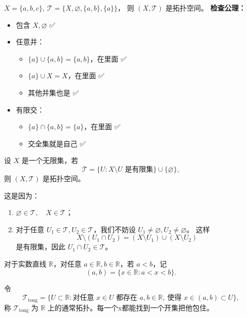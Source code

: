 \begin{example}
$X=\{a,b,c\},\ \mathcal{T}=\{X,\varnothing,\{a,b\},\{a\}\}$，  
则 $(X,\mathcal{T})$ 是拓扑空间。
\textbf{检查公理：}
\begin{itemize}
  \item 包含 $X, \varnothing$ ✅
  \item 任意并：
  \begin{itemize}
    \item $\{a\} \cup \{a,b\} = \{a,b\}$，在里面 ✅
    \item $\{a\} \cup X = X$，在里面 ✅
    \item 其他并集也是 ✅
  \end{itemize}
  \item 有限交：
  \begin{itemize}
    \item $\{a\} \cap \{a,b\} = \{a\}$，在里面 ✅
    \item 交全集就是自己 ✅
  \end{itemize}
\end{itemize}

\end{example}
\begin{example}
设 $X$ 是一个无限集，若
\[
\mathcal{T} = \{ U : X \setminus U \text{ 是有限集} \} \cup \{\varnothing\},
\]
则 $(X,\mathcal{T})$ 是拓扑空间。

这是因为：
\begin{enumerate}
  \item $\varnothing \in \mathcal{T}, \quad X \in \mathcal{T}$；
  \item 对于任意 $U_1 \in \mathcal{T}, U_2 \in \mathcal{T}$，我们不妨设 $U_1 \neq \varnothing, U_2 \neq \varnothing$。  
  这样
  \[
  X \setminus (U_1 \cap U_2) 
  = (X \setminus U_1) \cup (X \setminus U_2)
  \]
  是有限集，因此 $U_1 \cap U_2 \in \mathcal{T}$。
\end{enumerate}
\end{example}
\begin{example}[通常拓扑]
对于实数直线 $\mathbb{R}$，对任意 $a \in \mathbb{R}, b \in \mathbb{R}$，若 $a < b$，记
\[
(a,b) = \{ x \in \mathbb{R} : a < x < b \}.
\]

令
\[
\mathcal{T}_{\mathrm{tong}} = \{ U \subset \mathbb{R} : \text{对任意 } x \in U \text{ 都存在 } a,b \in \mathbb{R}, \ \text{使得 } x \in (a,b) \subset U \},
\]
称 $\mathcal{T}_{\mathrm{tong}}$ 为 $\mathbb{R}$ 上的通常拓扑。每一个x都能找到一个开集把他包住。
\end{example}
